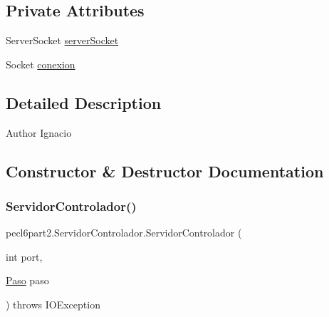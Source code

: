 \subsection*{Private Attributes}
\begin{DoxyCompactItemize}
\item 
Server\+Socket \mbox{\hyperlink{classpecl6part2_1_1_servidor_controlador_ac114e889059ed268a9df9f1dc7447f4b}{server\+Socket}}
\item 
Socket \mbox{\hyperlink{classpecl6part2_1_1_servidor_controlador_a5a4f104c0585b0e66492f05ef7e32510}{conexion}}
\end{DoxyCompactItemize}


\subsection{Detailed Description}
\begin{DoxyAuthor}{Author}
Ignacio 
\end{DoxyAuthor}


\subsection{Constructor \& Destructor Documentation}
\mbox{\label{classpecl6part2_1_1_servidor_controlador_a6f49d3d66d33c0f6dc5e7dab2af6766b}} 
\subsubsection{\texorpdfstring{Servidor\+Controlador()}{ServidorControlador()}}
{\footnotesize\ttfamily pecl6part2.\+Servidor\+Controlador.\+Servidor\+Controlador (\begin{DoxyParamCaption}\item[{int}]{port,  }\item[{\mbox{\hyperlink{classpecl6part2_1_1_paso}{Paso}}}]{paso }\end{DoxyParamCaption}) throws I\+O\+Exception\hspace{0.3cm}{\ttfamily [inline]}}


